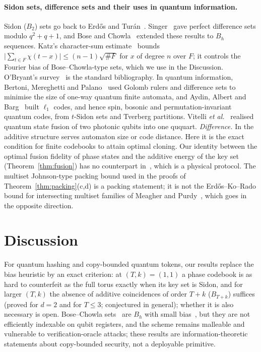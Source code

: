 \documentclass[11pt]{article}
\theoremstyle{definition}
\theoremstyle{remark}
\begin{document}
\paragraph{Sidon sets, difference sets and their uses in quantum information.}
Sidon ($B_2$) sets go back to Erd\H{o}s and Tur\'an~\cite{ErdosTuran1941}.
Singer~\cite{Singer1938} gave perfect difference sets modulo $q^2+q+1$, and Bose and Chowla~\cite{BoseChowla1962} extended these results to $B_h$ sequences.
Katz's character-sum estimate~\cite{Katz1989} bounds $\lvert\sum_{t\in F}\chi(t-x)\rvert\le(n-1)\sqrt{\#F}$ for $x$ of degree $n$ over $F$; it controls the Fourier bias of Bose--Chowla-type sets, which we use in the Discussion.
O'Bryant's survey~\cite{OBryant2004} is the standard bibliography.
In quantum information, Bertoni, Mereghetti and Palano~\cite{BertoniMereghettiPalano2003} used Golomb rulers and difference sets to minimise the size of one-way quantum finite automata, and Aydin, Albert and Barg~\cite{AydinAlbertBarg2026} built $\ell_1$ codes, and hence spin, bosonic and permutation-invariant quantum codes, from $t$-Sidon sets and Tverberg partitions.
Vitelli \emph{et al.}~\cite{Vitelli2013} realised quantum state fusion of two photonic qubits into one ququart.
\emph{Difference.} In \cite{BertoniMereghettiPalano2003,AydinAlbertBarg2026} the additive structure serves automaton size or code distance.
Here it is the exact condition for finite codebooks to attain optimal cloning.
Our identity between the optimal fusion fidelity of phase states and the additive energy of the key set (Theorem~\ref{thm:fusion}) has no counterpart in~\cite{Vitelli2013}, which is a physical protocol.
The multiset Johnson-type packing bound used in the proofs of Theorem~\ref{thm:packing}(c,d) is a packing statement; it is not the Erd\H{o}s--Ko--Rado bound for intersecting multiset families of Meagher and Purdy~\cite{MeagherPurdy2011}, which goes in the opposite direction.

\section{Discussion}
For quantum hashing and copy-bounded quantum tokens, our results replace the bias heuristic by an exact criterion: at $(T,k)=(1,1)$ a phase codebook is as hard to counterfeit as the full torus exactly when its key set is Sidon, and for larger
$(T,k)$ the absence of additive coincidences of order $T+k$ ($B_{T+k}$) suffices (proved for $d=2$ and for $T\le3$; conjectured in
general); whether it is also necessary is open. Bose--Chowla sets~\cite{BoseChowla1962} are $B_h$ with small bias~\cite{Katz1989}, but they are not efficiently
indexable on qubit registers, and the scheme remains malleable and vulnerable to verification-oracle attacks; these results are
information-theoretic statements about copy-bounded security, not a deployable primitive.
\end{document}
